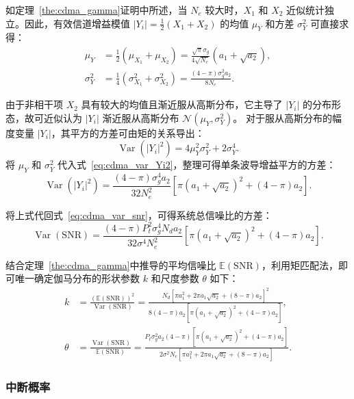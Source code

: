 如定理~\ref{the:cdma_gamma}证明中所述，当 $N_e$ 较大时，$X_1$ 和 $X_2$ 近似统计独立。因此，有效信道增益模值 $|Y_i| = \frac{1}{2}(X_1 + X_2)$ 的均值 $\mu_Y$ 和方差 $\sigma_Y^2$ 可直接求得：
\begin{align}
	\mu_Y &= \frac{1}{2}(\mu_{X_1} + \mu_{X_2}) = \frac{\sqrt{\pi} \sigma_g}{4 \sqrt{N_e}}(a_1 + \sqrt{a_2}), \\
	\sigma_Y^2 &= \frac{1}{4}(\sigma_{X_1}^2 + \sigma_{X_2}^2) = \frac{(4-\pi)\sigma_g^2 a_2}{8 N_e}.
\end{align}

由于非相干项 $X_2$ 具有较大的均值且渐近服从高斯分布，它主导了 $|Y_i|$ 的分布形态，故可近似认为 $|Y_i|$ 渐近服从高斯分布 $\mathcal{N}(\mu_Y, \sigma_Y^2)$。
对于服从高斯分布的幅度变量 $|Y_i|$，其平方的方差可由矩的关系导出：
\begin{equation}\label{eq:cdma_var_Yi2}
	\operatorname{Var}(|Y_i|^2) = 4\mu_Y^2 \sigma_Y^2 + 2\sigma_Y^4.
\end{equation}
将 $\mu_Y$ 和 $\sigma_Y^2$ 代入式~\eqref{eq:cdma_var_Yi2}，整理可得单条波导增益平方的方差：
\begin{equation}
	\operatorname{Var}(|Y_i|^2) = \frac{(4-\pi)\sigma_g^4 a_2}{32 N_e^2} \left[ \pi(a_1 + \sqrt{a_2})^2 + (4-\pi)a_2 \right].
\end{equation}

将上式代回式~\eqref{eq:cdma_var_snr}，可得系统总信噪比的方差：
\begin{equation}\label{eq:cdma_var_snr_output}
	\operatorname{Var}(\mathrm{SNR}) = 
	\frac{(4-\pi) P_t^2 \sigma_g^4 N_d a_2}{32 \sigma^4 N_e^2} \left[ \pi(a_1 + \sqrt{a_2})^2 + (4-\pi)a_2 \right].
\end{equation}

结合定理~\ref{the:cdma_gamma}中推导的平均信噪比 $\mathbb{E}(\mathrm{SNR})$，利用矩匹配法，即可唯一确定伽马分布的形状参数 $k$ 和尺度参数 $\theta$ 如下：
\begin{align}\label{eq:cdma_gamma_k_theta}
	k &= \frac{(\mathbb{E}(\mathrm{SNR}))^2}{\operatorname{Var}(\mathrm{SNR})}
	= \frac{N_d [\pi a_1^2 + 2\pi a_1\sqrt{a_2} + (8-\pi)a_2]^2}{8(4-\pi)a_2 \left[ \pi(a_1+\sqrt{a_2})^2 + (4-\pi)a_2 \right]}, \\
	\theta &= \frac{\operatorname{Var}(\mathrm{SNR})}{\mathbb{E}(\mathrm{SNR})}
	= \frac{P_t \sigma_g^2 a_2 (4-\pi) \left[ \pi(a_1+\sqrt{a_2})^2 + (4-\pi)a_2 \right]}{2 \sigma^2 N_e [\pi a_1^2 + 2\pi a_1\sqrt{a_2} + (8-\pi)a_2]}.
\end{align}


\subsubsection{中断概率}

